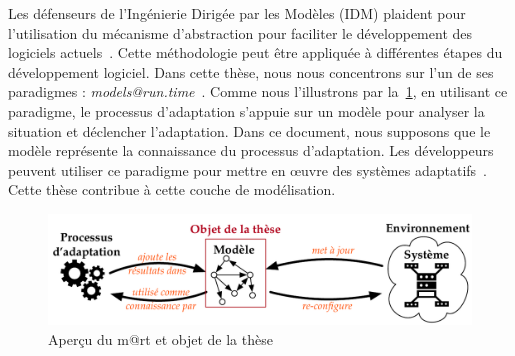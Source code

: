 Les défenseurs de l'Ingénierie Dirigée par les Modèles (IDM) plaident pour l'utilisation du mécanisme d'abstraction pour faciliter le développement des logiciels actuels~\cite{DBLP:journals/computer/Schmidt06, DBLP:conf/ifm/Kent02, DBLP:series/synthesis/2017Brambilla}. 
Cette méthodologie peut être appliquée à différentes étapes du développement logiciel. 
Dans cette thèse, nous nous concentrons sur l'un de ses paradigmes : \textit{models@run.time}~\cite{DBLP:journals/computer/BlairBF09, DBLP:journals/computer/MorinBJFS09}. 
Comme nous l'illustrons par la~\cref{fig_french_context_m@rt}, en utilisant ce paradigme, le processus d'adaptation s'appuie sur un modèle pour analyser la situation et déclencher l'adaptation. 
Dans ce document, nous supposons que le modèle représente la connaissance du processus d'adaptation. 
Les développeurs peuvent utiliser ce paradigme pour mettre en œuvre des systèmes adaptatifs~\cite{DBLP:journals/computer/MorinBJFS09, DBLP:conf/smartgridsec/0001FKNT14}.
Cette thèse contribue à cette couche de modélisation.


\begin{figure}
	\centering
	\includegraphics[width=.9\linewidth]{img/apdx-french/context/mart-focus}
	\caption{Aperçu du \gls{m@rt} et objet de la thèse}
	\label{fig_french_context_m@rt}
\end{figure}
